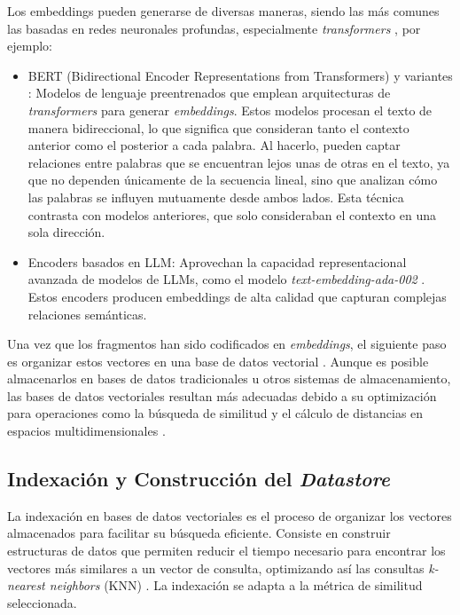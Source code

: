 Los embeddings pueden generarse de diversas maneras, siendo las más comunes las basadas en redes neuronales profundas, especialmente \textit{transformers} \cite{vaswani2017attention}, por ejemplo:

\begin{itemize} 
    \item BERT (Bidirectional Encoder Representations from Transformers) y variantes \cite{rajaraman2011data}: Modelos de lenguaje preentrenados que emplean arquitecturas de \textit{transformers} para generar \textit{embeddings}. Estos modelos procesan el texto de manera bidireccional, lo que significa que consideran tanto el contexto anterior como el posterior a cada palabra. Al hacerlo, pueden captar relaciones entre palabras que se encuentran lejos unas de otras en el texto, ya que no dependen únicamente de la secuencia lineal, sino que analizan cómo las palabras se influyen mutuamente desde ambos lados. Esta técnica contrasta con modelos anteriores, que solo consideraban el contexto en una sola dirección.
    \item Encoders basados en LLM: Aprovechan la capacidad representacional avanzada de modelos de LLMs, como el modelo \textit{text-embedding-ada-002} \cite{openai2022textembada}. Estos encoders producen embeddings de alta calidad que capturan complejas relaciones semánticas.
\end{itemize}

Una vez que los fragmentos han sido codificados en \textit{embeddings}, el siguiente paso es organizar estos vectores en una base de datos vectorial \cite{wu2024retrievalaugmentedgenerationnaturallanguage}. Aunque es posible almacenarlos en bases de datos tradicionales u otros sistemas de almacenamiento, las bases de datos vectoriales resultan más adecuadas debido a su optimización para operaciones como la búsqueda de similitud y el cálculo de distancias en espacios multidimensionales \cite{han2023comprehensivesurveyvectordatabase}.

\subsection{Indexación y Construcción del \textit{Datastore}}

La indexación en bases de datos vectoriales es el proceso de organizar los vectores almacenados para facilitar su búsqueda eficiente. Consiste en construir estructuras de datos que permiten reducir el tiempo necesario para encontrar los vectores más similares a un vector de consulta, optimizando así las consultas \textit{k-nearest neighbors} (KNN) \cite{johnson2021billion}. La indexación se adapta a la métrica de similitud seleccionada.

